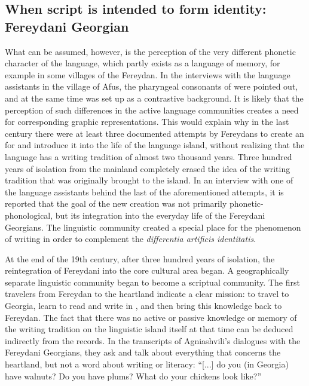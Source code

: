 \documentclass[output=paper,colorlinks,citecolor=brown,arabicfont,georgian]{langscibook}
\begin{document}
\subsection{When script is intended to form identity: Fereydani Georgian}\label{3.8.ss.2.1}

What can be assumed, however, is the perception of the very different phonetic character of the  language, which partly exists as a language of memory, for example in some villages of the Fereydan. In the interviews with the language assistants in the village of Afus, the pharyngeal consonants of  were pointed out, and at the same time  was set up as a contrastive background. It is likely that the perception of such differences in the active language communities creates a need for corresponding graphic representations. This would explain why in the last century there were at least three documented attempts by  Fereydans to create an  for  and introduce it into the life of the language island, without realizing that the  language has a writing tradition of almost two thousand years. Three hundred years of isolation from the mainland completely erased the idea of the writing tradition that was originally brought to the island. In an interview with one of the language assistants behind the last of the aforementioned attempts, it is reported that the goal of the new  creation was not primarily phonetic-phonological, but its integration into the everyday life of the Fereydani Georgians. The linguistic community created a special place for the phenomenon of writing in order to complement the \textit{differentia artificis identitatis}. 

At the end of the 19th century, after three hundred years of isolation, the reintegration of Fereydani  into the core  cultural area began. A geographically separate linguistic community began to become a scriptual community. The first travelers from Fereydan to the heartland indicate a clear mission: to travel to Georgia, learn to read and write in , and then bring this knowledge back to Fereydan. The fact that there was no active or passive knowledge or memory of the writing tradition on the linguistic island itself at that time can be deduced indirectly from the records. In the transcripts of Agniashvili's dialogues \citep{agniashvili1896} with the Fereydani Georgians, they ask and talk about everything that concerns the heartland, but not a word about writing or literacy: ``[...] do you (in Georgia) have walnuts? Do you have plums? What do your chickens look like?''
\end{document}
